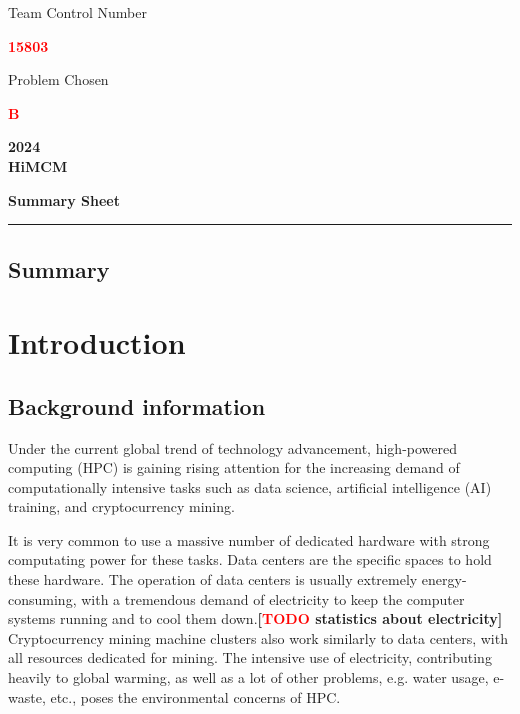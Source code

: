 \documentclass[12pt]{article}
\newcommand{\identifierRedFont}[1]{{\huge \textbf{\textcolor{red}{#1}}}}
\newcommand{\todo}[1]{\textbf{[\textcolor{red}{TODO} #1]}}
\begin{document}
\thispagestyle{empty}

\begin{center}
	Team Control Number
	
	\identifierRedFont{15803}

	Problem Chosen
	
	\identifierRedFont{B}

	\textbf{\large 2024} \\
	\textbf{HiMCM}

	\textbf{\small Summary Sheet}
\end{center}

\noindent\rule{\textwidth}{1pt}

\begin{center}
	\section*{Summary}
\end{center}

\newpage

{\center\tableofcontents}

\newpage

\section{Introduction}

\subsection{Background information}

Under the current global trend of technology advancement, high-powered computing (HPC) is gaining rising attention for the increasing demand of computationally intensive tasks such as data science, artificial intelligence (AI) training, and cryptocurrency mining.

It is very common to use a massive number of dedicated hardware with strong computating power for these tasks. Data centers are the specific spaces to hold these hardware. The operation of data centers is usually extremely energy-consuming, with a tremendous demand of electricity to keep the computer systems running and to cool them down.\todo{statistics about electricity} Cryptocurrency mining machine clusters also work similarly to data centers, with all resources dedicated for mining. The intensive use of electricity, contributing heavily to global warming, as well as a lot of other problems, e.g. water usage, e-waste, etc., poses the environmental concerns of HPC.
\end{document}
